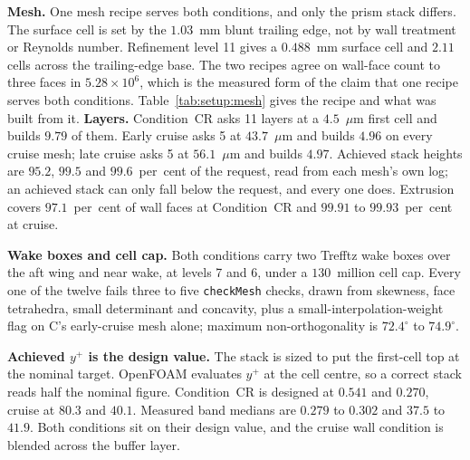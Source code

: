 \label{sec:setup:mesh}
\textbf{Mesh.} One mesh recipe serves both conditions, and only the prism stack differs. The
surface cell is set by the $1.03$~mm blunt trailing edge, not by wall treatment or Reynolds
number. Refinement level 11 gives a $\num{0.488}$~mm surface cell and $2.11$ cells across the
trailing-edge base. The two recipes agree on wall-face count to three faces in
$5.28\times10^{6}$, which is the measured form of the claim that one recipe serves both
conditions. Table~\ref{tab:setup:mesh} gives the recipe and what was built from it.
\textbf{Layers.} Condition~CR asks 11 layers at a $4.5$~$\mu$m first cell and builds $9.79$ of
them. Early cruise asks 5 at $43.7$~$\mu$m and builds $4.96$ on every cruise mesh; late cruise
asks 5 at $56.1$~$\mu$m and builds $4.97$. Achieved stack heights are $95.2$, $99.5$ and
$99.6$~per~cent of the request, read from each mesh's own log; an achieved stack can only fall
below the request, and every one does. Extrusion covers $97.1$~per~cent of wall faces at
Condition~CR and $99.91$ to $99.93$~per~cent at cruise.

\textbf{Wake boxes and cell cap.} Both conditions carry two Trefftz wake boxes over the aft
wing and near wake, at levels 7 and 6, under a $130$~million cell cap. Every one of the twelve fails three to five \texttt{checkMesh} checks,
drawn from skewness, face tetrahedra, small determinant and concavity, plus a
small-interpolation-weight flag on C's early-cruise mesh alone; maximum non-orthogonality is $72.4^{\circ}$ to
$74.9^{\circ}$.

\textbf{Achieved $y^+$ is the design value.} The stack is sized to put the first-cell top at the
nominal target. OpenFOAM evaluates $y^+$ at the cell centre, so a correct stack reads half the
nominal figure. Condition~CR is designed at $0.541$ and $0.270$, cruise at $80.3$ and $40.1$.
Measured band medians are $0.279$ to $0.302$ and $37.5$ to $41.9$. Both conditions sit on their
design value, and the cruise wall condition is blended across the buffer layer.

